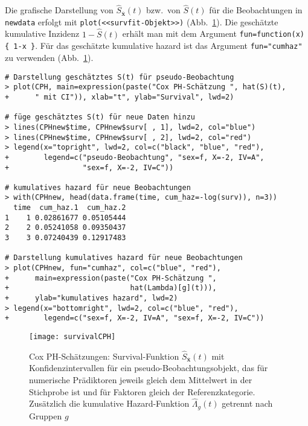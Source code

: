 Die grafische Darstellung von $\hat{S}_{\overline{\bm{x}}}(t)$ bzw.\ von $\hat{S}(t)$ für die Beobachtungen in \lstinline!newdata! erfolgt mit \lstinline!plot(<<survfit-Objekt>>)! (Abb.\ \ref{fig:survivalCPH}). Die geschätzte kumulative Inzidenz $1-\hat{S}(t)$ erhält man mit dem Argument \lstinline!fun=function(x) { 1-x }!. Für das geschätzte kumulative hazard ist das Argument \lstinline!fun="cumhaz"! zu verwenden (Abb.\ \ref{fig:survivalCPH}).
\begin{lstlisting}
# Darstellung geschätztes S(t) für pseudo-Beobachtung
> plot(CPH, main=expression(paste("Cox PH-Schätzung ", hat(S)(t),
+      " mit CI")), xlab="t", ylab="Survival", lwd=2)

# füge geschätztes S(t) für neue Daten hinzu
> lines(CPHnew$time, CPHnew$surv[ , 1], lwd=2, col="blue")
> lines(CPHnew$time, CPHnew$surv[ , 2], lwd=2, col="red")
> legend(x="topright", lwd=2, col=c("black", "blue", "red"),
+        legend=c("pseudo-Beobachtung", "sex=f, X=-2, IV=A",
+                 "sex=f, X=-2, IV=C"))

# kumulatives hazard für neue Beobachtungen
> with(CPHnew, head(data.frame(time, cum_haz=-log(surv)), n=3))
  time  cum_haz.1  cum_haz.2
1    1 0.02861677 0.05105444
2    2 0.05241058 0.09350437
3    3 0.07240439 0.12917483

# Darstellung kumulatives hazard für neue Beobachtungen
> plot(CPHnew, fun="cumhaz", col=c("blue", "red"),
+      main=expression(paste("Cox PH-Schätzung ",
+                            hat(Lambda)[g](t))),
+      ylab="kumulatives hazard", lwd=2)
> legend(x="bottomright", lwd=2, col=c("blue", "red"),
+        legend=c("sex=f, X=-2, IV=A", "sex=f, X=-2, IV=C"))
\end{lstlisting}

\begin{figure}[ht]
\centering
\texttt{[image: survivalCPH]}
\vspace*{-1em}
\caption{Cox PH-Schätzungen: Survival-Funktion $\hat{S}_{\overline{\bm{x}}}(t)$ mit Konfidenzintervallen für ein pseudo-Beobachtungsobjekt, das für numerische Prädiktoren jeweils gleich dem Mittelwert in der Stichprobe ist und für Faktoren gleich der Referenzkategorie. Zusätzlich die kumulative Hazard-Funktion $\hat{\Lambda}_{g}(t)$ getrennt nach Gruppen $g$}
\label{fig:survivalCPH}
\end{figure}

